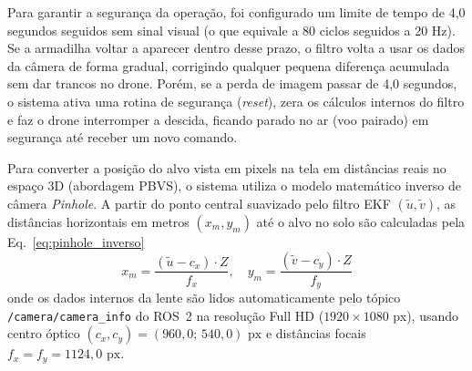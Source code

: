 Para garantir a segurança da operação, foi configurado um limite de tempo de 4,0 segundos seguidos sem sinal visual (o que equivale a 80 ciclos seguidos a 20 Hz). Se a armadilha voltar a aparecer dentro desse prazo, o filtro volta a usar os dados da câmera de forma gradual, corrigindo qualquer pequena diferença acumulada sem dar trancos no drone. Porém, se a perda de imagem passar de 4,0 segundos, o sistema ativa uma rotina de segurança (\textit{reset}), zera os cálculos internos do filtro e faz o drone interromper a descida, ficando parado no ar (voo pairado) em segurança até receber um novo comando.


Para converter a posição do alvo vista em pixels na tela em distâncias reais no espaço 3D (abordagem PBVS), o sistema utiliza o modelo matemático inverso de câmera \textit{Pinhole}. A partir do ponto central suavizado pelo filtro EKF $(\tilde{u}, \tilde{v})$, as distâncias horizontais em metros $(x_m, y_m)$ até o alvo no solo são calculadas pela Eq.~\eqref{eq:pinhole_inverso}
\begin{equation}
	x_m = \frac{(\tilde{u} - c_x) \cdot Z}{f_x}, \quad y_m = \frac{(\tilde{v} - c_y) \cdot Z}{f_y}
	\label{eq:pinhole_inverso}
\end{equation}
onde os dados internos da lente são lidos automaticamente pelo tópico \texttt{/camera/\allowbreak camera\_info} do ROS~2 na resolução Full HD ($1920 \times 1080$ px), usando centro óptico $(c_x, c_y) = (960,0;\, 540,0)\text{ px}$ e distâncias focais $f_x = f_y = 1124,0\text{ px}$.

